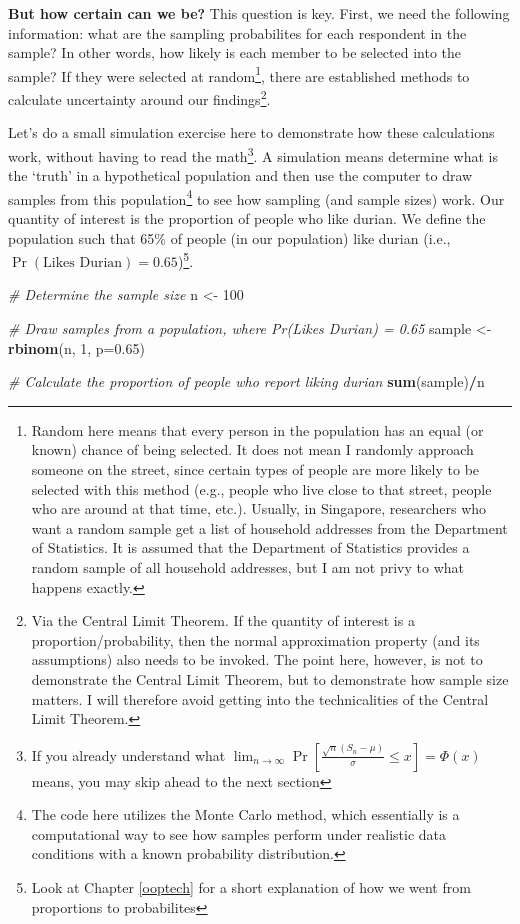 \documentclass[openany]{book}
\newenvironment{Shaded}{\begin{snugshade}}{\end{snugshade}}
\newcommand{\KeywordTok}[1]{\textcolor[rgb]{0.13,0.29,0.53}{\textbf{#1}}}
\newcommand{\DataTypeTok}[1]{\textcolor[rgb]{0.13,0.29,0.53}{#1}}
\newcommand{\DecValTok}[1]{\textcolor[rgb]{0.00,0.00,0.81}{#1}}
\newcommand{\FloatTok}[1]{\textcolor[rgb]{0.00,0.00,0.81}{#1}}
\newcommand{\StringTok}[1]{\textcolor[rgb]{0.31,0.60,0.02}{#1}}
\newcommand{\CommentTok}[1]{\textcolor[rgb]{0.56,0.35,0.01}{\textit{#1}}}
\newcommand{\OperatorTok}[1]{\textcolor[rgb]{0.81,0.36,0.00}{\textbf{#1}}}
\newcommand{\NormalTok}[1]{#1}
\let\rmarkdownfootnote\footnote%
\def\footnote{\protect\rmarkdownfootnote}
\begin{document}
\textbf{But how certain can we be?} This question is key. First, we need
the following information: what are the sampling probabilites for each
respondent in the sample? In other words, how likely is each member to
be selected into the sample? If they were selected at random\footnote{Random
  here means that every person in the population has an equal (or known)
  chance of being selected. It does not mean I randomly approach someone
  on the street, since certain types of people are more likely to be
  selected with this method (e.g., people who live close to that street,
  people who are around at that time, etc.). Usually, in Singapore,
  researchers who want a random sample get a list of household addresses
  from the Department of Statistics. It is assumed that the Department
  of Statistics provides a random sample of all household addresses, but
  I am not privy to what happens exactly.}, there are established
methods to calculate uncertainty around our findings\footnote{Via the
  Central Limit Theorem. If the quantity of interest is a
  proportion/probability, then the normal approximation property (and
  its assumptions) also needs to be invoked. The point here, however, is
  not to demonstrate the Central Limit Theorem, but to demonstrate how
  sample size matters. I will therefore avoid getting into the
  technicalities of the Central Limit Theorem.}.

Let's do a small simulation exercise here to demonstrate how these
calculations work, without having to read the math\footnote{If you
  already understand what
  \(\lim_{n \to \infty} \Pr\left[\frac{\sqrt{n}(S_n - \mu)}{\sigma} \leq x \right]= \Phi(x)\)
  means, you may skip ahead to the next section}. A simulation means
determine what is the `truth' in a hypothetical population and then use
the computer to draw samples from this population\footnote{The code here
  utilizes the Monte Carlo method, which essentially is a computational
  way to see how samples perform under realistic data conditions with a
  known probability distribution.} to see how sampling (and sample
sizes) work. Our quantity of interest is the proportion of people who
like durian. We define the population such that 65\% of people (in our
population) like durian (i.e.,
\(\Pr(\text{Likes Durian}) = 0.65\))\footnote{Look at Chapter
  \ref{ooptech} for a short explanation of how we went from proportions
  to probabilites}.

\begin{Shaded}
\begin{Highlighting}[]
\CommentTok{# Determine the sample size }
\NormalTok{n <-}\StringTok{ }\DecValTok{100}

\CommentTok{# Draw samples from a population, where Pr(Likes Durian) = 0.65}
\NormalTok{sample <-}\StringTok{ }\KeywordTok{rbinom}\NormalTok{(n, }\DecValTok{1}\NormalTok{, }\DataTypeTok{p=}\FloatTok{0.65}\NormalTok{)}

\CommentTok{# Calculate the proportion of people who report liking durian}
\KeywordTok{sum}\NormalTok{(sample)}\OperatorTok{/}\NormalTok{n}
\end{Highlighting}
\end{Shaded}
\end{document}

